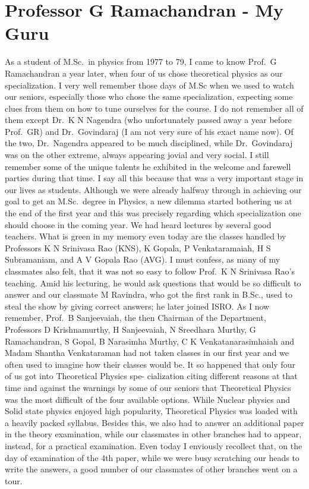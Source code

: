 \chapter[Professor G Ramachandran - My Guru]{Professor G Ramachandran - My Guru}\label{chap26}


\noindent
As a student of M.Sc.\ in physics from 1977 to 79, I came to know Prof.\ G Ramachandran a year later, when four of us chose theoretical physics as our specialization. I very well remember those days of M.Sc when we used to watch our seniors, especially those who chose the same specialization, expecting some clues from them on how to tune ourselves for the course. I do not remember all of them except Dr.\ K N Nagendra (who unfortunately passed away a year before Prof.\ GR) and Dr.\ Govindaraj (I am not very sure of his exact name now). Of the two, Dr.\ Nagendra appeared to be much disciplined, while Dr.\ Govindaraj was on the other extreme, always appearing jovial and very social. I still remember some of the unique talents he exhibited in the welcome and farewell parties during that time. I say all this because that was a very important stage in our lives as students. Although we were already halfway through in achieving our goal to get an M.Sc.\ degree in Physics, a new dilemma started bothering us at the end of the first year and this was precisely regarding which specialization one should choose in the coming year. We had heard lectures by several good teachers. What is green in my memory even today are the classes handled by Professors K N Srinivasa Rao (KNS), K Gopala, P Venkataramaiah, H S Subramaniam, and A V Gopala Rao (AVG). I must confess, as many of my classmates also felt, that it was not so easy to follow Prof.\ K N Srinivasa Rao's teaching. Amid his lecturing, he would ask questions that would be so difficult to answer and our classmate M Ravindra, who got the first rank in B.Sc., used to steal the show by giving correct answers; he later joined ISRO. As I now remember, Prof.\ B Sanjeevaiah, the then Chairman of the Department, Professors D Krishnamurthy, H Sanjeevaiah, N Sreedhara Murthy, G Ramachandran, S Gopal, B Narasimha Murthy, C K Venkatanarasimhaiah and Madam Shantha Venkataraman had not taken classes in our first year and we often used to imagine how their classes would be. It so happened that only four of us got into Theoretical Physics spe- cialization citing different reasons at that time and against the warnings by some of our seniors that Theoretical Physics was the most difficult of the four available options. While Nuclear physics and Solid state physics enjoyed high popularity, Theoretical Physics was loaded with a heavily packed syllabus. Besides this, we also had to answer an additional paper in the theory examination, while our classmates in other branches had to appear, instead, for a practical examination. Even today I enviously recollect that, on the day of examination of the 4th paper, while we were busy scratching our heads to write the answers, a good number of our classmates of other branches went on a tour.

